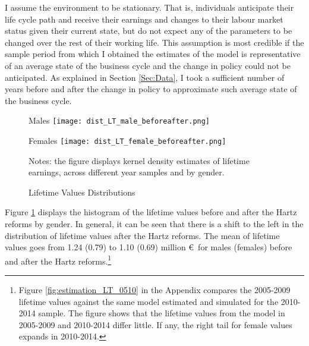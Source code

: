 \documentclass[12pt, a4paper]{article}
\begin{document}
I assume the environment to be stationary. That is, individuals anticipate their life cycle path and receive their earnings and changes to their labour market status given their current state, but do not expect any of the parameters to be changed over the rest of their working life. This assumption is most credible if the sample period from which I obtained the estimates of the model is representative of an average state of the business cycle and the change in policy could not be anticipated. As explained in Section \ref{Sec:Data}, I took a sufficient number of years before and after the change in policy to approximate such average state of the business cycle.

\begin{figure}[!t]
	\centering
	\begin{minipage}[b]{0.48\textwidth}{Males}
		\centering
		\texttt{[image: dist\_LT\_male\_beforeafter.png]}
	\end{minipage}
	\begin{minipage}[b]{0.48\textwidth}{Females}
		\centering
		\texttt{[image: dist\_LT\_female\_beforeafter.png]}
	\end{minipage}
	\footnotesize{
		\justifying Notes: the figure displays kernel density estimates of lifetime earnings, across different year samples and by gender.\par}
	\captionsetup{font=small,justification=raggedright}
	\caption{Lifetime Values Distributions}\label{fig:estimation_LT}
\end{figure}

Figure \ref{fig:estimation_LT} displays the histogram of the lifetime values before and after the Hartz reforms by gender. In general, it can be seen that there is a shift to the left in the distribution of lifetime values after the Hartz reforms. The mean of lifetime values goes from 1.24 (0.79) to 1.10 (0.69) million \euro \, for males (females) before and after the Hartz reforms.\footnote{Figure \ref{fig:estimation_LT_0510} in the Appendix compares the 2005-2009 lifetime values against the same model estimated and simulated for the 2010-2014 sample. The figure shows that the lifetime values from the model in 2005-2009 and 2010-2014 differ little. If any, the right tail for female values expands in 2010-2014.}
\end{document}

